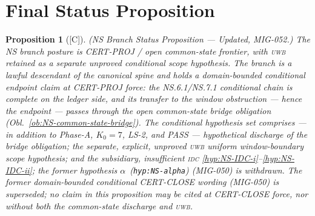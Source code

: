 \documentclass[12pt,oneside]{amsbook}
\theoremstyle{plain}
\newtheorem{proposition}[theorem]{Proposition}
\theoremstyle{definition}
\theoremstyle{remark}
\newcommand{\status}[1]{\textup{[#1]}}
\begin{document}
\section{Final Status Proposition}

\begin{proposition}[\status{C}]\label{prop:NS-status}
\textup{(NS Branch Status Proposition --- Updated, MIG-052.)}
The NS branch posture is \emph{CERT-PROJ / open common-state
frontier, with \textsc{uwb} retained as a separate unproved
conditional scope hypothesis}. The branch is a lawful descendant of
the canonical spine and
holds a domain-bounded conditional endpoint claim at
\emph{CERT-PROJ} force: the NS.6.1/NS.7.1 conditional chain is
complete on the ledger side, and its transfer to the window
obstruction --- hence the endpoint --- passes through the open
common-state bridge obligation
(Obl.~\ref{ob:NS-common-state-bridge}). The conditional hypothesis
set comprises --- in addition to Phase-A, $K_0=7$, LS-2, and PASS
--- hypothetical discharge of the bridge obligation; the separate,
explicit, unproved \textsc{uwb} uniform window-boundary scope
hypothesis; and the subsidiary,
insufficient \textsc{idc}
\eqref{hyp:NS-IDC-i}--\eqref{hyp:NS-IDC-ii}; the former hypothesis
$\alpha$~(\texttt{hyp:NS-alpha}) (MIG-050) is withdrawn. The former
domain-bounded conditional CERT-CLOSE wording (MIG-050) is
superseded; no claim in this proposition may be cited at CERT-CLOSE
force, nor without both the common-state discharge and \textsc{uwb}.
\end{proposition}
\end{document}
